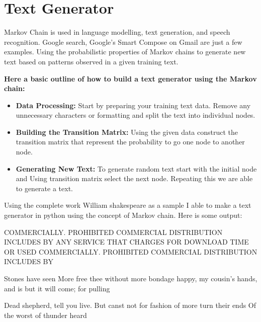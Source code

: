 \section{Text Generator}
Markov Chain is used in language modelling, text generation, and speech recognition. Google search, Google’s Smart Compose on Gmail are just a few examples.
Using the probabilistic properties of Markov chains to generate new text based on patterns observed in a given training text.

\textbf{Here a basic outline of how to build a text generator using the Markov chain:}
\begin{itemize}
    \item \textbf{Data Processing:} Start by preparing your training text data. 
        Remove any unnecessary characters or formatting and split the text into individual nodes.
    \item \textbf{Building the Transition Matrix:} Using the given data construct the transition matrix that represent the probability to go 
        one node to another node.
    \item \textbf{Generating New Text:} To generate random text start with the initial node and Using transition matrix select the next node. 
        Repeating this we are able to generate a text.
\end{itemize}

Using the complete work William shakespeare as a sample I able to make a text generator in python using the concept of Markov chain. Here is some output:

\begin{tcolorbox}[colback=white, colframe=black, sharp corners, boxrule=0.5pt, left=10pt, right=10pt, top=10pt, bottom=10pt]
    \small{COMMERCIALLY. PROHIBITED COMMERCIAL DISTRIBUTION INCLUDES BY ANY SERVICE THAT CHARGES FOR DOWNLOAD TIME OR USED COMMERCIALLY. PROHIBITED COMMERCIAL DISTRIBUTION INCLUDES BY}
\end{tcolorbox}

\begin{tcolorbox}[colback=white, colframe=black, sharp corners, boxrule=0.5pt, left=10pt, right=10pt, top=10pt, bottom=10pt]
    Stones have seen More free thee without more bondage happy, my cousin's hands, and is but it will come; for pulling
\end{tcolorbox}

\begin{tcolorbox}[colback=white, colframe=black, sharp corners, boxrule=0.5pt, left=10pt, right=10pt, top=10pt, bottom=10pt]
Dead shepherd, tell you live. But canst not for fashion of more turn their ends Of the worst of thunder heard
\end{tcolorbox}

